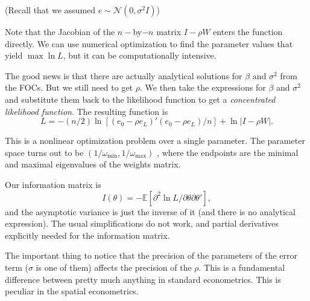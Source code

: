 \documentclass[11pt,a4paper]{amsart}
\theoremstyle{plain}
\theoremstyle{definition}
\begin{document}
(Recall that we assumed $e \sim \mathscr{N}(0, \sigma^{2}I)$) 

Note that the Jacobian of the $n-$by$-n$ matrix $I-\rho W$ enters the function directly. We can use numerical optimization to find the parameter values that yield $\max \ln L$, but it can be computationally intensive.

The good news is that there are actually analytical solutions for $\beta$ and $\sigma^{2}$ from the FOCs. But we still need to get $\rho$. We then take the expressions for  $\beta$ and $\sigma^{2}$ and substitute them back to the likelihood function to get a \textit{concentrated likelihood function}. The resulting function is 
\[	L = -(n/2) \ln [(e_{0}-\rho e_{L})'(e_{0}-\rho e_{L})/n] + \ln |I-\rho W|.	\]

This is a nonlinear optimization problem over a single parameter. The parameter space turns out to be $(1/\omega_{\min}, 1/\omega_{\max})$ , where the endpoints are the minimal and maximal eigenvalues of the weights matrix. 

Our information matrix is 
\[	I(\theta) = - \mathbb{E}[\partial^{2} \ln  L/\partial \theta \partial \theta'],	\]
and the asymptotic variance is just the inverse of it (and there is no analytical expression). The usual simplifications do not work, and partial derivatives explicitly needed for the information matrix. 

The important thing to notice that the precision of the parameters of the error term ($\sigma$ is one of them) affects the precision of the $\rho$. This is a fundamental difference between pretty much anything in standard econometrics. This is peculiar in the spatial econometrics. 





\printbibliography %
		
\end{document}
